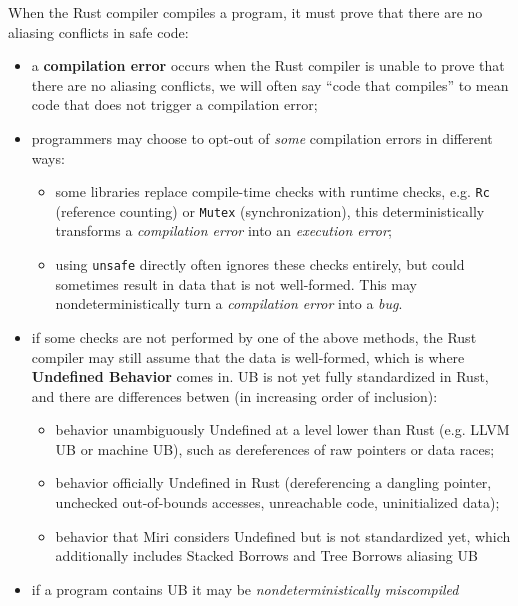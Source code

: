 \documentclass[a4paper,11pt]{article}
\theoremstyle{plain}
\theoremstyle{definition}
\theoremstyle{remark}
\begin{document}
When the Rust compiler compiles a program, it must prove that there are no aliasing conflicts
in safe code:
\begin{itemize}
    \item a \textbf{compilation error} occurs when the Rust compiler is unable to
        prove that there are no aliasing conflicts, we will often say ``code that compiles''
        to mean code that does not trigger a compilation error;
    \item programmers may choose to opt-out of \textit{some} compilation errors in
        different ways:
        \begin{itemize}
            \item some libraries replace compile-time checks with runtime checks, e.g.
                \texttt{Rc} (reference counting) or \texttt{Mutex} (synchronization),
                this deterministically transforms a \textit{compilation error} into an
                \textit{execution error};
            \item using \texttt{unsafe} directly often ignores these checks entirely,
                but could sometimes result in data that is not well-formed.
                This may nondeterministically turn a \textit{compilation error}
                into a \textit{bug}.
        \end{itemize}
    \item if some checks are not performed by one of the above methods,
        the Rust compiler may still assume that the data is well-formed, which
        is where \textbf{Undefined Behavior} comes in.
        UB is not yet fully standardized in Rust, and there are differences betwen
        (in increasing order of inclusion):
        \begin{itemize}
            \item behavior unambiguously Undefined at a level lower than Rust
                (e.g. LLVM UB or machine UB), such as dereferences of raw pointers or data races;
            \item behavior officially Undefined in Rust (dereferencing a dangling pointer,
                unchecked out-of-bounds accesses, unreachable code, uninitialized data);
            \item behavior that Miri considers Undefined but is not standardized yet,
                which additionally includes Stacked Borrows and Tree Borrows aliasing UB
        \end{itemize}
    \item if a program contains UB it may be \textit{nondeterministically miscompiled}

\end{itemize}
\end{document}
